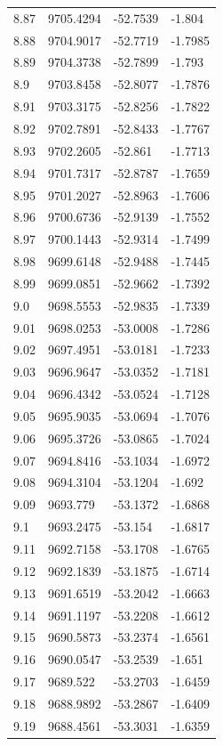 \begin{table}[H]
\begin{tabular}{llll}
8.87 & 9705.4294 & -52.7539 & -1.804 \\
8.88 & 9704.9017 & -52.7719 & -1.7985 \\
8.89 & 9704.3738 & -52.7899 & -1.793 \\
8.9 & 9703.8458 & -52.8077 & -1.7876 \\
8.91 & 9703.3175 & -52.8256 & -1.7822 \\
8.92 & 9702.7891 & -52.8433 & -1.7767 \\
8.93 & 9702.2605 & -52.861 & -1.7713 \\
8.94 & 9701.7317 & -52.8787 & -1.7659 \\
8.95 & 9701.2027 & -52.8963 & -1.7606 \\
8.96 & 9700.6736 & -52.9139 & -1.7552 \\
8.97 & 9700.1443 & -52.9314 & -1.7499 \\
8.98 & 9699.6148 & -52.9488 & -1.7445 \\
8.99 & 9699.0851 & -52.9662 & -1.7392 \\
9.0 & 9698.5553 & -52.9835 & -1.7339 \\
9.01 & 9698.0253 & -53.0008 & -1.7286 \\
9.02 & 9697.4951 & -53.0181 & -1.7233 \\
9.03 & 9696.9647 & -53.0352 & -1.7181 \\
9.04 & 9696.4342 & -53.0524 & -1.7128 \\
9.05 & 9695.9035 & -53.0694 & -1.7076 \\
9.06 & 9695.3726 & -53.0865 & -1.7024 \\
9.07 & 9694.8416 & -53.1034 & -1.6972 \\
9.08 & 9694.3104 & -53.1204 & -1.692 \\
9.09 & 9693.779 & -53.1372 & -1.6868 \\
9.1 & 9693.2475 & -53.154 & -1.6817 \\
9.11 & 9692.7158 & -53.1708 & -1.6765 \\
9.12 & 9692.1839 & -53.1875 & -1.6714 \\
9.13 & 9691.6519 & -53.2042 & -1.6663 \\
9.14 & 9691.1197 & -53.2208 & -1.6612 \\
9.15 & 9690.5873 & -53.2374 & -1.6561 \\
9.16 & 9690.0547 & -53.2539 & -1.651 \\
9.17 & 9689.522 & -53.2703 & -1.6459 \\
9.18 & 9688.9892 & -53.2867 & -1.6409 \\
9.19 & 9688.4561 & -53.3031 & -1.6359 \\

\end{tabular}
\end{table}
